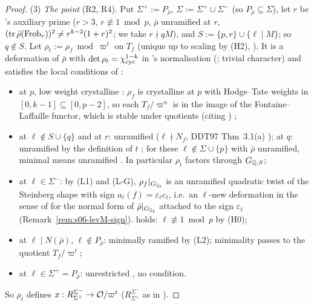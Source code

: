 \begin{proof}
(3) \emph{The point} (R2, R4). Put $\Sigma^+:=P_{\bar\rho}$, $\Sigma:=\Sigma^+\cup\Sigma^-$ (so $P_{\bar\rho}\subseteq\Sigma$), let $r$ be \cite{KO}'s auxiliary
prime \cite[(2.2), p.~3]{KO} ($r>3$, $r\not\equiv1\bmod p$, $\bar\rho$ unramified at $r$, $(\operatorname{tr}\bar\rho(\mathrm{Frob}_r))^2\ne r^{k-2}(1+r)^2$; we take
$r\nmid qM$), and $S:=\{p,r\}\cup\{\ell\mid M\}$; so $q\notin S$. Let $\rho_t:=\rho_f\bmod\varpi^t$ on $T_f$ (unique up to scaling by (H2),
\cite[\S2.2, p.~6]{KO}). It is a deformation of $\bar\rho$ with $\det\rho_t=\chi_{\rm cyc}^{1-k}$ in \cite{KO}'s normalisation (\cite[p.~3, footnote 1]{KO};
trivial character) and satisfies the local conditions of \cite[Def.~3.9, p.~11]{KO}:
\begin{itemize}
\item at $p$, low weight crystalline \cite[Def.~3.3, p.~10]{KO}: $\rho_f$ is crystalline at $p$ with Hodge--Tate weights in
  $[0,k-1]\subseteq[0,p-2]$, so each $T_f/\varpi^n$ is in the image of the Fontaine--Laffaille functor, which is stable under quotients
  \cite[\S3.2.1, p.~9]{KO} (citing \cite[\S1.1.2]{DFG}) \stcited;
\item at $\ell\notin S\cup\{q\}$ and at $r$: unramified ($\ell\nmid N_f$, DDT97 Thm~3.1(a)
  ); at $q$: unramified by the definition of $t$
  \cite[Def.~2.12]{KO}; for these $\ell\notin\Sigma\cup\{p\}$ with $\bar\rho$ unramified, minimal means unramified \cite[Def.~3.5(1), p.~10]{KO}.
  In particular $\rho_t$ factors through $G_{\mathbb{Q},S}$;
\item at $\ell\in\Sigma^-$: by (L1) and (L-G), $\rho_f|_{G_{\mathbb{Q}_\ell}}$ is an unramified quadratic twist of the Steinberg shape with sign
  $a_\ell(f)=\varepsilon_\ell c_\ell$, i.e.\ an $\ell$-new deformation in the sense of \cite[Def.~3.7(1), \S3.2.5, p.~10--11]{KO} for the normal form
  of $\bar\rho|_{G_{\mathbb{Q}_\ell}}$ attached to the sign $\varepsilon_\ell$ (Remark~\ref{rem:s06-levM-sign}). \cite[Assumption~3.6(1)]{KO} holds:
  $\ell\not\equiv1\bmod p$ by (H0);
\item at $\ell\mid N(\bar\rho)$, $\ell\notin P_{\bar\rho}$: minimally ramified by (L2); minimality passes to the quotient $T_f/\varpi^t$;
\item at $\ell\in\Sigma^+=P_{\bar\rho}$: unrestricted \cite[Def.~3.9(3)]{KO}, no condition.
\end{itemize}
So $\rho_t$ defines $x:R^{\Sigma^-}_{\Sigma^+}\to\mathcal{O}/\varpi^t$ ($R^{\Sigma^-}_{\Sigma^+}$ as in \cite[Def.~3.9, p.~11]{KO}). \stpmc


\end{proof}
